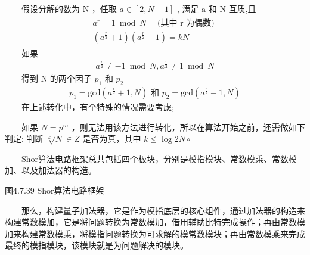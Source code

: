 \documentclass[a4paper,11pt,english]{sphinxmanual}
\let\sphinxpxdimen\pdfpxdimen\else\newdimen\sphinxpxdimen
\begin{document}
\sphinxAtStartPar
{}

\sphinxAtStartPar
  假设分解的数为 \(\mathrm{N}\) ，任取  \(a \in[2, N-1]\) , 满足  \(\mathrm{a}\) 和  \(\mathrm{N}\) 互质,且
\begin{equation*}
\begin{split}\begin{array}{l}a^{r}=1 \bmod N \quad \text { (其中 } \mathrm{r} \text { 为偶数) } \\\left(a^{\frac{r}{2}}+1\right)\left(a^{\frac{r}{2}}-1\right)=k N\end{array}\end{split}
\end{equation*}
\sphinxAtStartPar
  如果
\begin{equation*}
\begin{split}a^{\frac{r}{2}} \neq-1 \bmod N, a^{\frac{r}{2}} \neq 1 \bmod N\end{split}
\end{equation*}
\sphinxAtStartPar
  得到  \(\mathrm{N}\) 的两个因子  \(p_{1}\) 和  \(p_{2}\)
\begin{equation*}
\begin{split}p_{1}=\text{gcd}\left(a^{\frac{r}{2}}+1, N\right) \text { 和 } p_{2}=\text{gcd}\left(a^{\frac{r}{2}}-1, N\right)\end{split}
\end{equation*}
\sphinxAtStartPar
  在上述转化中，有个特殊的情况需要考虑;

\sphinxAtStartPar
  如果 \(N=p^{m}\) ，则无法用该方法进行转化，所以在算法开始之前，还需做如下判定: 判断 \(\sqrt[k]{N} \in Z\) 是否为真，其中  \(k \leq \log {2} N{\circ}\)

\sphinxAtStartPar
{}

\sphinxAtStartPar
  Shor算法电路框架总共包括四个板块，分别是模指模块、常数模乘、常数模加、以及加法器的构造。

\noindent{\hspace*{\fill}\sphinxincludegraphics[width=700\sphinxpxdimen]{{4.7.39}.png}\hspace*{\fill}}

\begin{center}图4.7.39 Shor算法电路框架
\end{center}
\sphinxAtStartPar
  那么，构建量子加法器，它是作为模指底层的核心组件，通过加法器的构造来构建常数模加，它是将问题转换为常数模加，借用辅助比特完成操作；再由常数模加来构建常数模乘，将模指问题转换为可求解的模常数模块；再由常数模乘来完成最终的模指模块，该模块就是为问题解决的模块。
\end{document}
